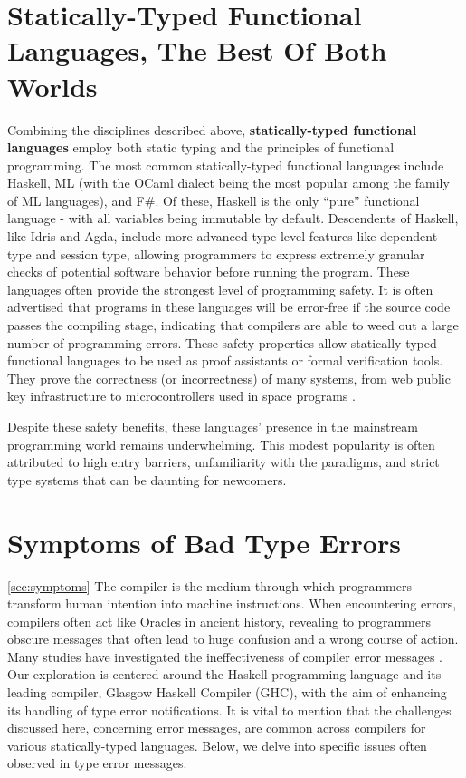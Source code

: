 \section{Statically-Typed Functional Languages, The Best Of Both Worlds}
Combining the disciplines described above, \textbf{statically-typed functional languages} employ both static typing and the principles of functional programming. The most common statically-typed functional languages include Haskell,  ML (with the OCaml dialect being the most popular among the family of ML languages), and F\#. 
Of these, Haskell is the only ``pure'' functional language - with all variables being immutable by default.
Descendents of Haskell, like Idris and Agda, include more advanced type-level features like dependent type and session type, allowing programmers to express extremely granular checks of potential software behavior before running the program. These languages often provide the strongest level of programming safety. It is often advertised that programs in these languages will be error-free if the source code passes the compiling stage, indicating that compilers are able to weed out a large number of programming errors. These safety properties allow statically-typed functional languages to be used as proof assistants or formal verification tools. They prove the correctness (or incorrectness) of many systems, from web public key infrastructure \cite{Bhargavan2021-no} to microcontrollers used in space programs \cite{Mokhov2019-zj}. 

Despite these safety benefits, these languages' presence in the mainstream programming world remains underwhelming. This modest popularity is often attributed to high entry barriers, unfamiliarity with the paradigms, and strict type systems that can be daunting for newcomers.

\section{Symptoms of Bad Type Errors}

\ref{sec:symptoms}
 The compiler is the medium through which programmers transform human intention into machine instructions. When encountering errors, compilers often act like Oracles in ancient history, revealing to programmers obscure messages that often lead to huge confusion and a wrong course of action. Many studies have investigated the ineffectiveness of compiler error messages \cite{Barik2017-gy, Becker2019-cs, Becker2016-kc}.  Our exploration is centered around the Haskell programming language and its leading compiler, Glasgow Haskell Compiler (GHC), with the aim of enhancing its handling of type error notifications. It is vital to mention that the challenges discussed here, concerning error messages, are common across compilers for various statically-typed languages. Below, we delve into specific issues often observed in type error messages.


